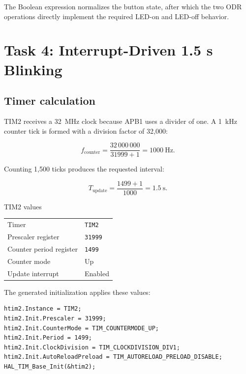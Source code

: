 \documentclass[11pt,a4paper]{article}
\begin{document}


The Boolean expression normalizes the button state, after which the two ODR operations directly implement the required LED-on and LED-off behavior.

\section{Task 4: Interrupt-Driven 1.5 s Blinking}

\subsection{Timer calculation}

TIM2 receives a \SI{32}{\mega\hertz} clock because APB1 uses a divider of one. A \SI{1}{\kilo\hertz} counter tick is formed with a division factor of 32,000:

\[
f_{\mathrm{counter}} = \frac{32\,000\,000}{31999 + 1} = \SI{1000}{\hertz}.
\]

Counting 1,500 ticks produces the requested interval:

\[
T_{\mathrm{update}} = \frac{1499 + 1}{1000} = \SI{1.5}{\second}.
\]

\begin{resultbox}{TIM2 values}
\begin{center}
\begin{tabular}{@{}ll@{}}
Timer & \texttt{TIM2}\\
Prescaler register & \texttt{31999}\\
Counter period register & \texttt{1499}\\
Counter mode & Up\\
Update interrupt & Enabled\\
\end{tabular}
\end{center}
\end{resultbox}

The generated initialization applies these values:

\begin{lstlisting}
htim2.Instance = TIM2;
htim2.Init.Prescaler = 31999;
htim2.Init.CounterMode = TIM_COUNTERMODE_UP;
htim2.Init.Period = 1499;
htim2.Init.ClockDivision = TIM_CLOCKDIVISION_DIV1;
htim2.Init.AutoReloadPreload = TIM_AUTORELOAD_PRELOAD_DISABLE;
HAL_TIM_Base_Init(&htim2);
\end{lstlisting}
\end{document}
